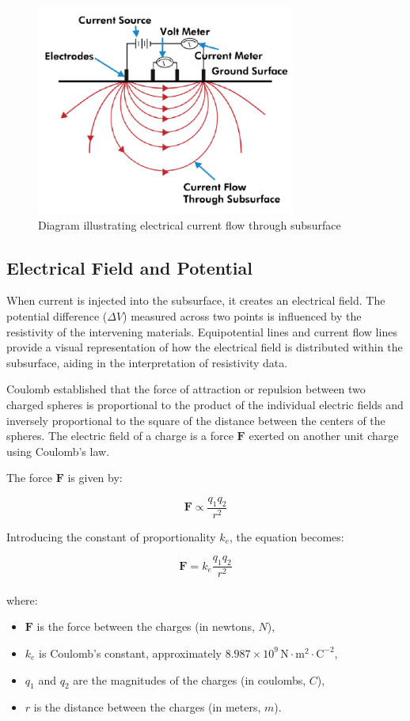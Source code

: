\documentclass[12pt,a4paper]{report}
\begin{document}
\begin{figure}[H]
    \centering
    \includegraphics[width=0.76\textwidth]{current-flow.png}
    \caption{Diagram illustrating electrical current flow through subsurface}
\end{figure}

\subsection{Electrical Field and Potential}
When current is injected into the subsurface, it creates an electrical field. The potential difference ($\Delta V$) measured across two points is influenced by the resistivity of the intervening materials. Equipotential lines and current flow lines provide a visual representation of how the electrical field is distributed within the subsurface, aiding in the interpretation of resistivity data.

Coulomb established that the force of attraction or repulsion between two charged spheres is proportional to the product of the individual electric fields and inversely proportional to the square of the distance between the centers of the spheres. The electric field of a charge is a force \(\mathbf{F}\) exerted on another unit charge using Coulomb's law.

The force \(\mathbf{F}\) is given by:

\begin{equation}
\mathbf{F} \propto \frac{q_1 q_2}{r^2}
\end{equation}

Introducing the constant of proportionality \(k_e\), the equation becomes:

\begin{equation}
\mathbf{F} = k_e \frac{q_1 q_2}{r^2}
\end{equation}
\\
where:
\begin{itemize}
    \item \(\mathbf{F}\) is the force between the charges (in newtons, \(N\)),
    \item \(k_e\) is Coulomb's constant, approximately \(8.987 \times 10^9 \, \mathrm{N \cdot m^2 \cdot C^{-2}}\),
    \item \(q_1\) and \(q_2\) are the magnitudes of the charges (in coulombs, \(C\)),
    \item \(r\) is the distance between the charges (in meters, \(m\)).
\end{itemize}
\end{document}

